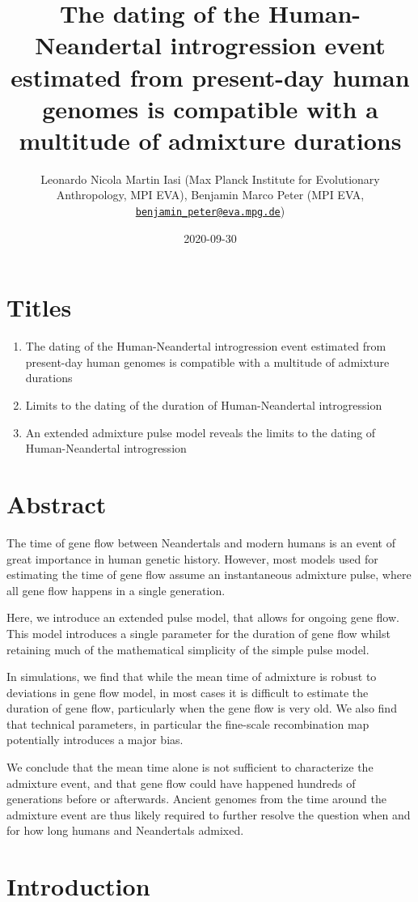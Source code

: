 \documentclass[]{article}
\title{The dating of the Human-Neandertal introgression event estimated from present-day human genomes is compatible with a multitude of admixture durations}
\author{Leonardo Nicola Martin Iasi (Max Planck Institute for Evolutionary
Anthropology, MPI EVA), Benjamin Marco Peter (MPI EVA,
\href{mailto:benjamin_peter@eva.mpg.de}{\nolinkurl{benjamin\_peter@eva.mpg.de}})}
\date{2020-09-30}
\begin{document}
\maketitle
\section{Titles}
\begin{enumerate}
    \item The dating of the Human-Neandertal introgression event estimated from present-day human genomes is compatible with a multitude of admixture durations
    \item Limits to the dating of the duration of Human-Neandertal introgression
    \item An extended admixture pulse model reveals the limits to the dating of Human-Neandertal introgression
\end{enumerate}
\section{Abstract}\label{abstract}


The time of gene flow between Neandertals and modern humans is an event of great importance in human genetic history. However, most models used for estimating the time of gene flow assume an instantaneous admixture pulse, where all gene flow happens in a single generation. 

Here, we introduce an extended pulse model, that allows for ongoing gene flow. This model introduces a single parameter for the duration of gene flow whilst retaining much of the mathematical simplicity of the simple pulse model. 

In simulations, we find that while the mean time of admixture is robust to deviations in gene flow model, in most cases it is difficult to estimate the duration of gene flow, particularly when the gene flow is very old. We also find that technical parameters, in particular the fine-scale recombination map potentially introduces a major bias.

We conclude that the mean time alone is not sufficient to characterize the admixture event, and that gene flow could have happened hundreds of generations before or afterwards. Ancient genomes from the time around the admixture event are thus likely required to further resolve the question when and for how long humans and Neandertals admixed.

\section{Introduction}\label{introduction}
\end{document}
